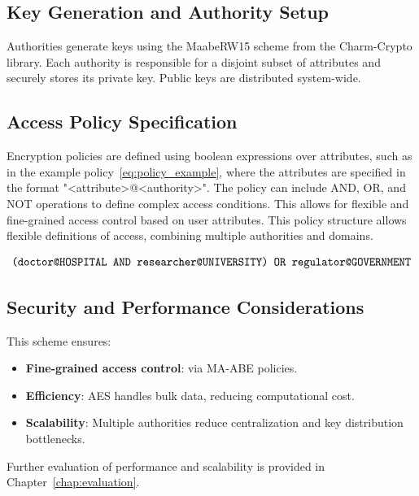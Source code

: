 \documentclass[cic,tc,english]{iiufrgs}
\begin{document}
        \subsection{Key Generation and Authority Setup}
            Authorities generate keys using the MaabeRW15 scheme from the Charm-Crypto library. Each authority is responsible for a disjoint subset of attributes and securely stores its private key. Public keys are distributed system-wide.

        \subsection{Access Policy Specification}
            Encryption policies are defined using boolean expressions over attributes, such as in the example policy~\ref{eq:policy_example}, where the attributes are specified in the format "<attribute>@<authority>". The policy can include AND, OR, and NOT operations to define complex access conditions. This allows for flexible and fine-grained access control based on user attributes.
            This policy structure allows flexible definitions of access, combining multiple authorities and domains.

            \begin{equation}
                \label{eq:policy_example}
                \texttt{(\allowbreak doctor@HOSPITAL \allowbreak AND \allowbreak researcher@UNIVERSITY) \allowbreak OR \allowbreak regulator@GOVERNMENT}
            \end{equation}


        \subsection{Security and Performance Considerations}
            This scheme ensures:
            \begin{itemize}
            \item \textbf{Fine-grained access control}: via MA-ABE policies.
            \item \textbf{Efficiency}: AES handles bulk data, reducing computational cost.
            \item \textbf{Scalability}: Multiple authorities reduce centralization and key distribution bottlenecks.
            \end{itemize}

            Further evaluation of performance and scalability is provided in Chapter~\ref{chap:evaluation}.
\end{document}
